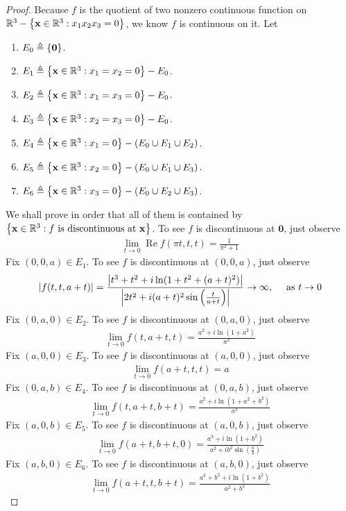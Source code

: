 \documentclass{report}
\begin{document}
\begin{proof}
Because $f$ is the quotient of two nonzero continuous function on $\mathbb{R}^3 - \left\{ \textbf{x}\in\mathbb{R}^3: x_1x_2x_3=0 \right\}$, we know $f$ is continuous on it. Let 
\begin{enumerate}[label=(\roman*)]
  \item $E_0 \triangleq \left\{ \textbf{0} \right\}$. 
  \item $E_1\triangleq \left\{ \textbf{x}\in\mathbb{R}^3:x_1=x_2=0 \right\}-E_0$. 
  \item $E_2 \triangleq \left\{ \textbf{x}\in\mathbb{R}^3 : x_1=x_3=0 \right\}-E_0$.
  \item $E_3\triangleq \left\{ \textbf{x}\in\mathbb{R}^3:x_2=x_3=0 \right\}-E_0$. 
  \item $E_4\triangleq \left\{ \textbf{x}\in\mathbb{R}^3:x_1=0 \right\}- (E_0 \cup E_1 \cup  E_2) $. 
  \item $E_5 \triangleq \left\{ \textbf{x}\in\mathbb{R}^3:x_2=0 \right\}- (E_0 \cup E_1\cup  E_3)$. 
  \item $E_6 \triangleq \left\{ \textbf{x}\in\mathbb{R}^3: x_3=0 \right\}- (E_0 \cup  E_2 \cup E_3)$. 
\end{enumerate}
We shall prove in order that all of them is contained by $\left\{ \textbf{x}\in\mathbb{R}^3: f\text{ is discontinuous at }\textbf{x} \right\}$. To see $f$ is discontinuous at $\textbf{0}$, just observe
\begin{align*}
\lim_{t\to 0} \operatorname{Re}f(\pi t,t,t)= \frac{1}{\pi ^2 + 1}
\end{align*}
Fix $(0,0,a) \in E_1$. To see $f$ is discontinuous at $(0,0,a)$, just observe 
\begin{align*}
  \left| f(t,t,a+t)\right| =  \frac{ \left|t^3+t^2+ i \ln (1+t^2+(a+t)^2)\right|}{\left|2t^2 + i(a+t)^2 \sin \left(\frac{t}{a+t}\right)\right|} \rightarrow \infty ,\quad \text{ as }t\rightarrow 0
\end{align*}
Fix $(0,a,0)\in E_2$. To see $f$ is discontinuous at $(0,a,0)$, just observe 
\begin{align*}
 \lim_{t\to 0}f(t,a+t,t)= \frac{a^2+ i \ln (1+a^2)}{a^2} 
\end{align*}
Fix $(a,0,0)\in E_3$. To see $f$ is discontinuous at $(a,0,0)$, just observe 
\begin{align*}
\lim_{t\to 0} f(a+t,t,t)= a 
\end{align*}
Fix $(0,a,b)\in E_4$. To see $f$ is discontinuous at $(0,a,b)$, just observe 
\begin{align*}
\lim_{t\to 0} f(t,a+t,b+t)= \frac{a^2+ i \ln (1+a^2+b^2)}{a^2}
\end{align*}
Fix $(a,0,b)\in E_5$. To see $f$ is discontinuous at $(a,0,b)$, just observe 
\begin{align*}
\lim_{t\to 0} f(a+t,b+t,0)= \frac{a^3+ i \ln (1+b^2)}{a^2 + ib^2 \sin \left(\frac{a}{b} \right)}
\end{align*}
Fix $(a,b,0)\in E_6$. To see $f$ is discontinuous at $(a,b,0)$, just observe 
\begin{align*}
\lim_{t\to 0}  f(a+t,t,b+t)= \frac{a^3+b^2 + i \ln (1+b^2)}{a^2+b^2}
\end{align*}
\end{proof}
\end{document}
